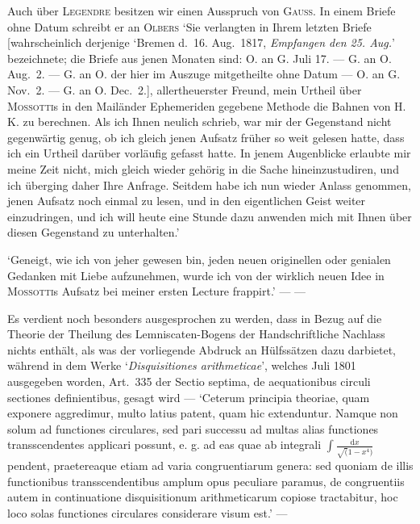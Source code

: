 
Auch über \textsc{Legendre} besitzen wir einen Ausspruch von \textsc{Gauss}. In einem Briefe ohne Datum schreibt er an \textsc{Olbers} ‘Sie verlangten in Ihrem letzten Briefe [wahrscheinlich derjenige ‘Bremen d.\ 16. Aug.\ 1817, \textit{Empfangen den 25. Aug.}’ bezeichnete; die Briefe aus jenen Monaten sind: O. an G. Juli 17. --- G. an O. Aug.\ 2. --- G. an O. der hier im Auszuge mitgetheilte ohne Datum --- O. an G. Nov.\ 2. --- G. an O. Dec.\ 2.], allertheuerster Freund, mein Urtheil über \textsc{Mossotti}s in den Mailänder Ephemeriden gegebene Methode die Bahnen von H. K. zu berechnen. Als ich Ihnen neulich schrieb, war mir der Gegenstand nicht gegenwärtig genug, ob ich gleich jenen Aufsatz früher so weit gelesen hatte, dass ich ein Urtheil darüber vorläufig gefasst hatte. In jenem Augenblicke erlaubte mir meine Zeit nicht, mich gleich wieder gehörig in die Sache hineinzustudiren, und ich überging daher Ihre Anfrage. Seitdem habe ich nun wieder Anlass genommen, jenen Aufsatz noch einmal zu lesen, und in den eigentlichen Geist weiter einzudringen, und ich will heute eine Stunde dazu anwenden mich mit Ihnen über diesen Gegenstand zu unterhalten.’

‘Geneigt, wie ich von jeher gewesen bin, jeden neuen originellen oder genialen Gedanken mit Liebe aufzunehmen, wurde ich von der wirklich neuen Idee in \textsc{Mossotti}s Aufsatz bei meiner ersten Lecture frappirt.’ --- ---

\medskip


\medskip
Es verdient noch besonders ausgesprochen zu werden, dass in Bezug auf die Theorie der Theilung des Lemniscaten-Bogens der Handschriftliche Nachlass nichts enthält, als was der vorliegende Abdruck an Hülfssätzen dazu darbietet, während in dem Werke ‘\textit{Disquisitiones arithmeticae}’, welches Juli 1801 ausgegeben worden, Art.\ 335 der Sectio septima, de aequationibus circuli sectiones definientibus, gesagt wird --- ‘Ceterum principia theoriae, quam exponere aggredimur, multo latius patent, quam hic extenduntur. Namque non solum ad functiones circulares, sed pari successu ad multas alias functiones transscendentes applicari possunt, e. g. ad eas quae ab integrali \(\displaystyle\int\frac{\mathrm{d}x}{\surd(1-x^{4})}\) pendent, praetereaque etiam ad varia congruentiarum genera: sed quoniam de illis functionibus transscendentibus amplum opus peculiare paramus, de congruentiis autem in continuatione disquisitionum arithmeticarum copiose tractabitur, hoc loco solas functiones circulares considerare visum est.’ ---


